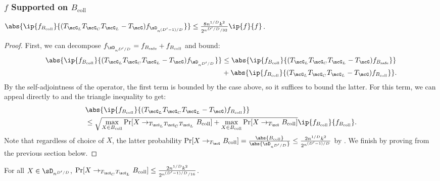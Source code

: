 \subsubsection{$f$ Supported on $B_{\mathrm{coll}}$}

\begin{lemma}
    $\abs{\ip{f_{B_{\mathrm{coll}}}}{(T_{\mcG_L}T_{\mcG_C}T_{\mcG_L} - T_\mcG) f_{\sD_{n^{(D'-1)/D}}}}} \leq \frac{8n^{1/D}k^2}{2^{n^{D'/D}/32}} \ip{f}{f}$.
\end{lemma}


\begin{proof}
First, we can decompose $f_{\sD_{n^{D'/D}}} = f_{B_{\mathrm{safe}}} + f_{B_{\mathrm{coll}}}$ and bound:
\begin{align*}
    \abs{\ip{f_{B_{\mathrm{coll}}}}{(T_{\mcG_L}T_{\mcG_C}T_{\mcG_L} - T_\mcG) f_{\sD_{n^{D'/D}}}}} 
    &\leq \abs{\ip{f_{B_{\mathrm{coll}}}}{(T_{\mcG_L}T_{\mcG_C}T_{\mcG_L} - T_\mcG) f_{B_{\mathrm{safe}}}}} \\
    &+ \abs{\ip{f_{B_{\mathrm{coll}}}}{(T_{\mcG_L}T_{\mcG_C}T_{\mcG_L} - T_\mcG) f_{B_{\mathrm{coll}}}}}.
\end{align*}
By the self-adjointness of the operator, the first term is bounded by the case above, so it suffices to bound the latter. For this term, we can appeal directly to  and the triangle inequality to get:
\begin{align*}
    &\abs{\ip{f_{B_{\mathrm{coll}}}}{(T_{\mcG_L}T_{\mcG_C}T_{\mcG_L} - T_\mcG) f_{B_{\mathrm{coll}}}}} \\
    &\leq\sqrt{\max_{X \in B_{\mathrm{coll}}} \Pr[X \to_{T_{\mcG_L}T_{\mcG_C}T_{\mcG_L}} B_{\mathrm{coll}}] + \max_{X \in B_{\mathrm{coll}}} \Pr[X \to_{T_\mcG} B_{\mathrm{coll}}]} \ip{f_{B_{\mathrm{coll}}}}{f_{B_{\mathrm{coll}}}}.
\end{align*}
Note that regardless of choice of $X$, the latter probability $\Pr[X \to_{T_\mcG} B_{\mathrm{coll}}] = \frac{\abs{B_{\mathrm{coll}}}}{\abs{\sD_{n^{D'/D}}}} \leq \frac{2n^{1/D}k^2}{2^{n^{(D'-1)/D}}}$ by . We finish by proving  from the previous section below.
\end{proof}
\begin{lemma}
    For all $X \in \sD_{n^{D'/D}}$, $\Pr[X \to_{T_{\mcG_C}T_{\mcG_L}} B_{\mathrm{coll}}] \leq \frac{2n^{1/D}k^2}{2^{n^{(D'-1)/D}/16}}$.
\end{lemma}
